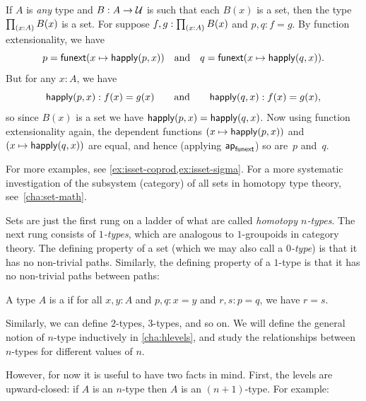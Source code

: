 \begin{eg}\label{thm:isset-forall}
  If $A$ is \emph{any} type and $B:A\to \mathcal{U}$ is such that each $B(x)$ is a set, then the type $\prd{x:A} B(x)$ is a set.
  For suppose $f,g:\prd{x:A} B(x)$ and $p,q:f=g$.
  By function extensionality, we have
  \begin{equation*}
    p = {\mathsf{funext} (x \mapsto \mathsf{happly}(p,x))}
    \quad\text{and}\quad
    q = {\mathsf{funext} (x \mapsto \mathsf{happly}(q,x))}.
  \end{equation*}
  But for any $x:A$, we have
  \begin{equation*}
   \mathsf{happly}(p,x):f(x)=g(x)
   \qquad\text{and}\qquad
   \mathsf{happly}(q,x):f(x)=g(x),
  \end{equation*}
  so since $B(x)$ is a set we have $\mathsf{happly}(p,x) = \mathsf{happly}(q,x)$.
  Now using function extensionality again, the dependent functions $(x \mapsto \mathsf{happly}(p,x))$ and $(x \mapsto \mathsf{happly}(q,x))$ are equal, and hence (applying $\mathsf{ap}_{\mathsf{funext}}$) so are~$p$ and~$q$.
\end{eg}

For more examples, see \cref{ex:isset-coprod,ex:isset-sigma}.  For a more systematic investigation of the subsystem (category) of all sets in homotopy type theory, see~\cref{cha:set-math}.

%

Sets are just the first rung on a ladder of what are called \emph{homotopy $n$-types}.
The next rung consists of \emph{$1$-types}, which are analogous to $1$-groupoids in category theory.
The defining property of a set (which we may also call a \emph{$0$-type}) is that it has no non-trivial paths.
Similarly, the defining property of a $1$-type is that it has no non-trivial paths between paths:

\begin{defn}\label{defn:1type}
  A type $A$ is a 
  if for all $x,y:A$ and $p,q:x=y$ and $r,s:p=q$, we have $r=s$.
\end{defn}

Similarly, we can define $2$-types, $3$-types, and so on.
We will define the general notion of $n$-type inductively in \cref{cha:hlevels}, and study the relationships between $n$-types for different values of $n$.

However, for now it is useful to have two facts in mind.
First, the levels are upward-closed: if $A$ is an $n$-type then $A$ is an $(n+1)$-type.
For example:

